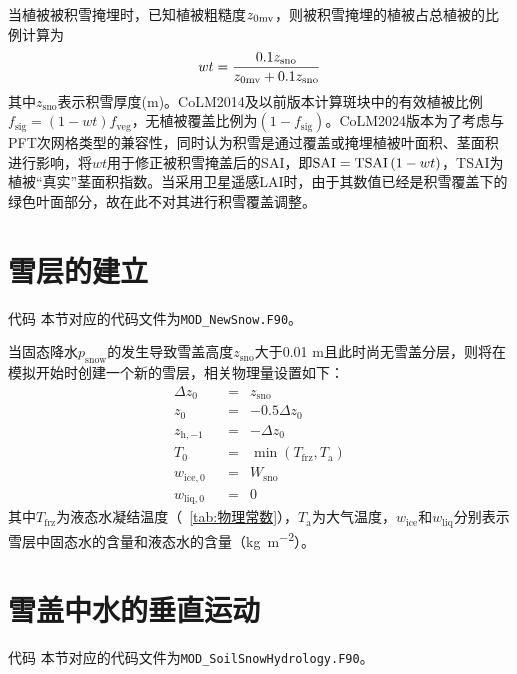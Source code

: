 当植被被积雪掩埋时，已知植被粗糙度$z_{\rm 0mv}$，则被积雪掩埋的植被占总植被的比例计算为
\begin{equation}
  wt=\frac{0.1 z_{\mathrm{sno}}}{z_{\rm 0mv}+0.1 z_{\mathrm{sno}}}
\end{equation}
其中$z_{\mathrm{sno}}$表示积雪厚度(m)。CoLM2014及以前版本计算斑块中的有效植被比例$f_{\mathrm{sig}}=\left(1-wt\right)f_{\mathrm{veg}}$，无植被覆盖比例为$\left(1-f_{\mathrm{sig}}\right)$。CoLM2024版本为了考虑与PFT次网格类型的兼容性，同时认为积雪是通过覆盖或掩埋植被叶面积、茎面积进行影响，将$wt$用于修正被积雪掩盖后的SAI，即${\rm SAI=TSAI}\left(1-wt\right)$，TSAI为植被“真实”茎面积指数。当采用卫星遥感LAI时，由于其数值已经是积雪覆盖下的绿色叶面部分，故在此不对其进行积雪覆盖调整。


\section{雪层的建立}\label{sec:雪层的建立}
\begin{mymdframed}{代码}
  本节对应的代码文件为\texttt{MOD\_NewSnow.F90}。
\end{mymdframed}


当固态降水$p_{\mathrm{snow}}$的发生导致雪盖高度$z_{\mathrm{sno}}$大于0.01 m且此时尚无雪盖分层，则将在模拟开始时创建一个新的雪层，相关物理量设置如下：
\begin{equation}
  \begin{aligned}
    & \Delta z_{0} &&= &{z}_{\mathrm{sno}}& \\
    & z_0 &&= &-0.5\Delta z_0& \\
    & z_{\mathrm{h,-1}} &&= &-\Delta z_0& \\
    & T_0 &&= &\min \left(T_{\mathrm {frz}} ,T_{\mathrm{a}}\right)& \\
    & w_{\mathrm{ice,0}} &&= &W_{\mathrm{sno}}& \\
    & w_{\mathrm{liq,0}} &&= &0&
  \end{aligned}
\end{equation}
其中$T_{\mathrm {frz}} $为液态水凝结温度（~\ref{tab:物理常数}），$T_{\mathrm{a}}$为大气温度，$w_{\mathrm{ice}}$和$w_{\mathrm{liq}}$分别表示雪层中固态水的含量和液态水的含量（\unit{kg.m^{-2}}）。

\section{雪盖中水的垂直运动}\label{雪盖的水量平衡}
\begin{mymdframed}{代码}
  本节对应的代码文件为\texttt{MOD\_SoilSnowHydrology.F90}。
\end{mymdframed}

